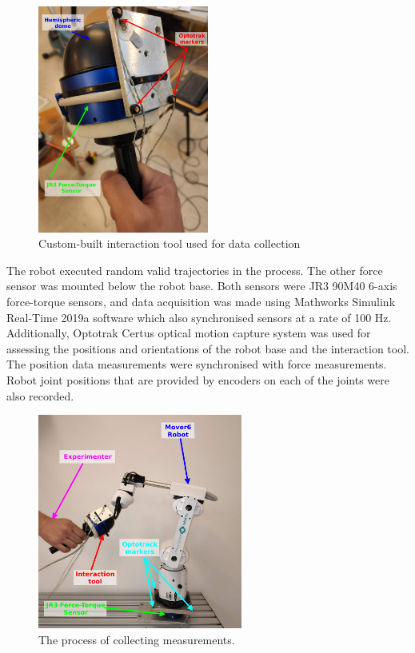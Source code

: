 \begin{figure}
    \centering
    \includegraphics[width=0.5\textwidth]{slike/tool}
    \caption{Custom-built interaction tool used for data collection}
    \label{fig:Tool}
\end{figure}

The robot executed random valid trajectories in the process. The other force sensor was mounted below the robot base. Both sensors were JR3 90M40 6-axis force-torque sensors, and data acquisition was made using Mathworks Simulink Real-Time 2019a software which also synchronised sensors at a rate of 100 Hz. Additionally, Optotrak Certus optical motion capture system was used for assessing the positions and orientations of the robot base and the interaction tool. The position data measurements were synchronised with force measurements. Robot joint positions that are provided by encoders on each of the joints were also recorded.

\begin{figure}
    \centering
    \includegraphics[width=0.6\textwidth]{slike/robot}
    \caption{The process of collecting measurements.}
    \label{fig:Robot}
\end{figure}

